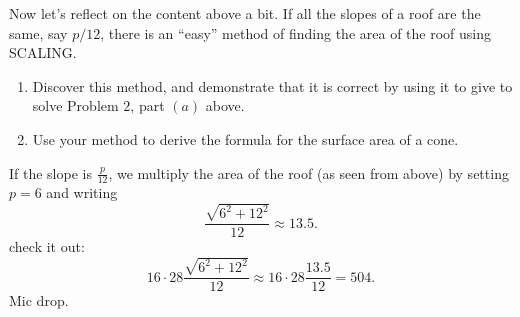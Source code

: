 \documentclass[hints,nooutcomes,noauthor,handout]{ximera}
\begin{document}
\mynewpage


\begin{question}
  Now let's reflect on the content above a bit. If all the slopes of a
  roof are the same, say $p/12$, there is an ``easy'' method of
  finding the area of the roof using SCALING.
  \begin{enumerate}
    \item Discover this method, and demonstrate that it is correct by using
    it to give to solve Problem $2$, part $(a)$ above.
    \item Use your method to derive the formula for the surface area
      of a cone. 
  \end{enumerate}
  \begin{freeResponse}
  If the slope is $\frac{p}{12}$, we multiply the area of the roof (as
  seen from above) by setting $p = 6$ and writing
    \[
    \frac{\sqrt{6^2+12^2}}{12} \approx 13.5.
    \]
    check it out:
    \[
    16\cdot 28 \frac{\sqrt{6^2+12^2}}{12} \approx 16\cdot 28 \frac{13.5}{12} = 504.
    \]
    Mic drop.
  \end{freeResponse}
\end{question}
\end{document}
